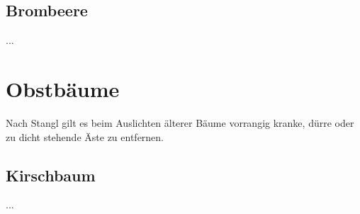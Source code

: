 \subsection{Brombeere}
...

\pagebreak

\section{Obstbäume}
\label{Bäume}

Nach Stangl \cite[S.~256]{Stangl1995} gilt es beim Auslichten älterer Bäume vorrangig kranke, dürre oder zu dicht stehende Äste zu entfernen.

\subsection{Kirschbaum}
...



\pagebreak